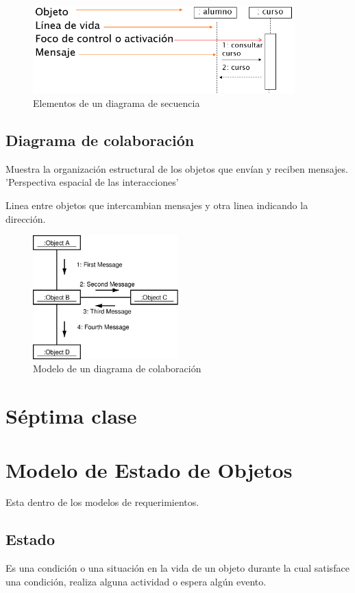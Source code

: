 \documentclass[titlepage,a4paper]{article}
\begin{document}
\begin{figure}[!htb]
    \centering
    \includegraphics[width=0.9\textwidth]{Imagenes/DiagramaDeSecuencia.png}
    \caption{Elementos de un diagrama de secuencia}
\end{figure}

\subsection{Diagrama de colaboración}
Muestra la organización estructural de los objetos que envían y reciben mensajes. 'Perspectiva espacial de las interacciones'

Linea entre objetos que intercambian mensajes y otra linea indicando la dirección.

\begin{figure}[!htb]
    \centering
    \includegraphics[width=0.5\textwidth]{Imagenes/CollaborationDiagram.png}
    \caption{Modelo de un diagrama de colaboración}
\end{figure}

\newpage

\section*{Séptima clase}
\section{Modelo de Estado de Objetos}
Esta dentro de los modelos de requerimientos.

\subsection{Estado}
Es una condición o una situación en la vida de un objeto durante la cual satisface una condición, realiza alguna actividad o espera algún evento.
\end{document}
